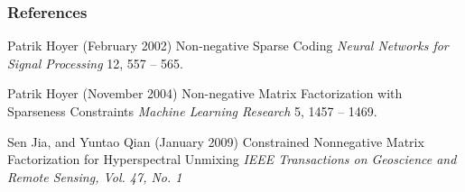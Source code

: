 \documentclass{beamer}
\begin{document}
\begin{frame}
\frametitle{References}
\footnotesize{
\begin{thebibliography}{99}

 Patrik Hoyer (February 2002)
\newblock Non-negative Sparse Coding
\newblock \emph{Neural Networks for Signal Processing} 12, 557 -- 565.

 Patrik Hoyer (November 2004)
\newblock Non-negative Matrix Factorization with Sparseness Constraints
\newblock \emph{Machine Learning Research} 5, 1457 -- 1469.

 Sen Jia, and Yuntao Qian (January 2009)
\newblock Constrained Nonnegative Matrix Factorization for Hyperspectral Unmixing
\newblock \emph{IEEE Transactions on Geoscience and Remote Sensing, Vol. 47, No. 1}

\end{thebibliography}
}
\end{frame}

\end{document}
